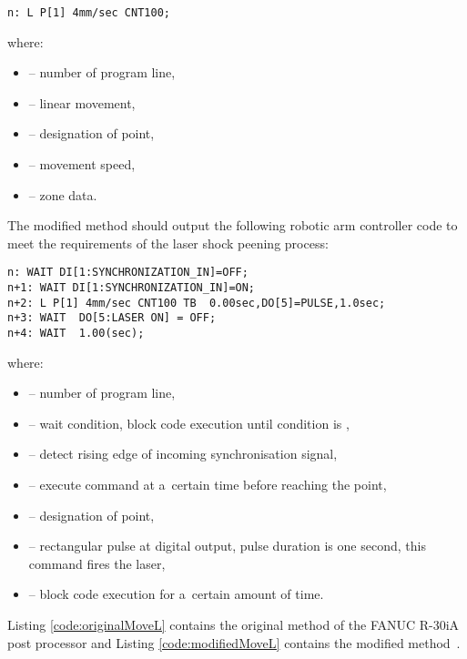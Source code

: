 \begin{lstlisting}[frame=lines,numbers=none,breaklines=true, language={}]
n: L P[1] 4mm/sec CNT100;
\end{lstlisting}


where:

\begin{itemize}

    \item {} -- number of program line, 
    \item {} -- linear movement,
    \item {} -- designation of point,
    \item {} -- movement speed,
    \item {} -- zone data.

\end{itemize}
The modified  method should output the following robotic arm controller code to meet the requirements of the laser shock peening process:


\begin{lstlisting}[frame=lines,numbers=none,breaklines=true, language={}]
n: WAIT DI[1:SYNCHRONIZATION_IN]=OFF;
n+1: WAIT DI[1:SYNCHRONIZATION_IN]=ON;
n+2: L P[1] 4mm/sec CNT100 TB  0.00sec,DO[5]=PULSE,1.0sec;
n+3: WAIT  DO[5:LASER ON] = OFF;
n+4: WAIT  1.00(sec);
\end{lstlisting}


where:

\begin{itemize}

    \item {} -- number of program line, 
    \item {} -- wait condition, block code execution until condition  is ,
    \item {} -- detect rising edge of incoming synchronisation signal,
    \item {} -- execute command at a~certain time before reaching the point,
    \item {} -- designation of point,
    \item {} -- rectangular pulse at digital output, pulse duration is one second, this command fires the laser,
    \item {} -- block code execution for a~certain amount of time.

\end{itemize}
Listing \ref{code:originalMoveL} contains the original  method of the FANUC R-30iA post processor and Listing \ref{code:modifiedMoveL} contains the modified  method~\cite{postmethods}. 


